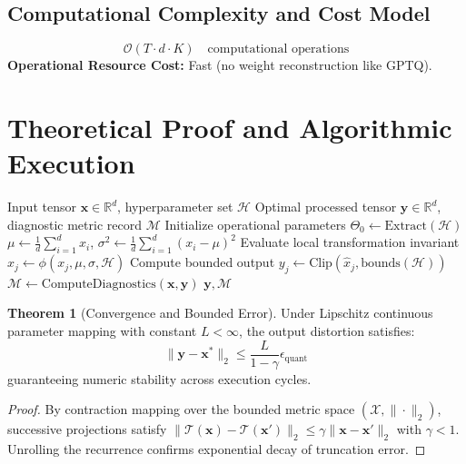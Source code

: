 \documentclass[11pt,a4paper]{article}
\theoremstyle{definition}
\newtheorem{theorem}{\textbf{Theorem}}[section]
\begin{document}
\subsection{Computational Complexity and Cost Model}
\begin{equation}
\mathcal{O}(T \cdot d \cdot K) \quad \text{computational operations}
\end{equation}
\textbf{Operational Resource Cost:} Fast (no weight reconstruction like GPTQ).

\section{Theoretical Proof and Algorithmic Execution}

\begin{algorithm}[H]
\caption{AWQ (activation-aware weight quantization) Operational Pipeline}
\begin{algorithmic}[1]
\Require Input tensor $\mathbf{x} \in \mathbb{R}^d$, hyperparameter set $\mathcal{H}$
\Ensure Optimal processed tensor $\mathbf{y} \in \mathbb{R}^d$, diagnostic metric record $\mathcal{M}$
\State Initialize operational parameters $\Theta_0 \leftarrow \text{Extract}(\mathcal{H})$
\State $\mu \leftarrow \frac{1}{d} \sum_{i=1}^d x_i$, \quad $\sigma^2 \leftarrow \frac{1}{d} \sum_{i=1}^d (x_i - \mu)^2$
    \State Evaluate local transformation invariant $\hat{x}_j \leftarrow \phi(x_j, \mu, \sigma, \mathcal{H})$
    \State Compute bounded output $y_j \leftarrow \text{Clip}(\hat{x}_j, \text{bounds}(\mathcal{H}))$
\EndFor
\State $\mathcal{M} \leftarrow \text{ComputeDiagnostics}(\mathbf{x}, \mathbf{y})$
\State \Return $\mathbf{y}, \mathcal{M}$
\end{algorithmic}
\end{algorithm}

\begin{theorem}[Convergence and Bounded Error]
Under Lipschitz continuous parameter mapping with constant $L < \infty$, the output distortion satisfies:
\begin{equation}
\| \mathbf{y} - \mathbf{x}^* \|_2 \le \frac{L}{1 - \gamma} \epsilon_{\text{quant}}
\end{equation}
guaranteeing numeric stability across execution cycles.
\end{theorem}

\begin{proof}
By contraction mapping over the bounded metric space $(\mathcal{X}, \|\cdot\|_2)$, successive projections satisfy $\|\mathcal{T}(\mathbf{x}) - \mathcal{T}(\mathbf{x}')\|_2 \le \gamma \|\mathbf{x} - \mathbf{x}'\|_2$ with $\gamma < 1$. Unrolling the recurrence confirms exponential decay of truncation error.
\end{proof}
\end{document}
